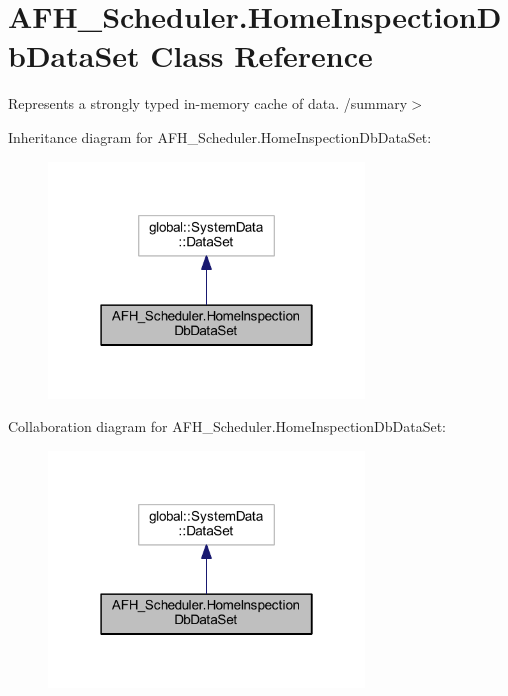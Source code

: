 \section{A\+F\+H\+\_\+\+Scheduler.\+Home\+Inspection\+Db\+Data\+Set Class Reference}
\label{class_a_f_h___scheduler_1_1_home_inspection_db_data_set}


Represents a strongly typed in-\/memory cache of data. /summary$>$  




Inheritance diagram for A\+F\+H\+\_\+\+Scheduler.\+Home\+Inspection\+Db\+Data\+Set\+:
\nopagebreak
\begin{figure}[H]
\begin{center}
\leavevmode
\includegraphics[width=238pt]{class_a_f_h___scheduler_1_1_home_inspection_db_data_set__inherit__graph}
\end{center}
\end{figure}


Collaboration diagram for A\+F\+H\+\_\+\+Scheduler.\+Home\+Inspection\+Db\+Data\+Set\+:
\nopagebreak
\begin{figure}[H]
\begin{center}
\leavevmode
\includegraphics[width=238pt]{class_a_f_h___scheduler_1_1_home_inspection_db_data_set__coll__graph}
\end{center}
\end{figure}
